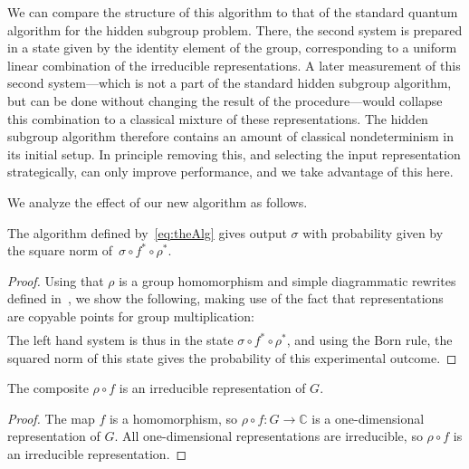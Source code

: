 We can compare the structure of this algorithm to that of the standard quantum algorithm for the hidden subgroup problem. There, the second system is prepared in a state given by the identity element of the group, corresponding to a uniform linear combination of the irreducible representations.  A later measurement of this second system---which is not a part of the standard hidden subgroup algorithm, but can be done without changing the result of the procedure---would collapse this combination to a classical mixture of these representations. The hidden subgroup algorithm therefore contains an amount of classical nondeterminism in its initial setup. In principle removing this, and selecting the input representation strategically, can only improve performance, and we take advantage of this here.

We analyze the effect of our new algorithm as follows.
\begin{lemma}
The algorithm defined by~\eqref{eq:theAlg} gives output $\sigma$ with probability given by the square norm of~$\sigma\circ f^*\circ\rho^*$.
\end{lemma}
\begin{proof}
Using that $\rho$ is a group homomorphism and simple diagrammatic rewrites defined in~\cite[Section~A.9]{vicary-tqa},
 we show the following, making use of the fact that representations are copyable points for group multiplication:
\begin{align}
\label{simplifyAlg}

\end{align}
The left hand system is thus in the state $\sigma\circ f^*\circ\rho^*$, and using the Born rule, the squared norm of this state gives the probability of this experimental outcome.
\end{proof}

\begin{lemma}\label{lem:irrep}
The composite $\rho\circ f$ is an irreducible representation of $G$.
\end{lemma}
\begin{proof}
The map $f$ is a homomorphism, so $\rho\circ f:G\to\mathbb{C}$ is a one-dimensional representation of $G$. All one-dimensional representations are irreducible, so $\rho\circ f$ is an irreducible representation.
\end{proof}


